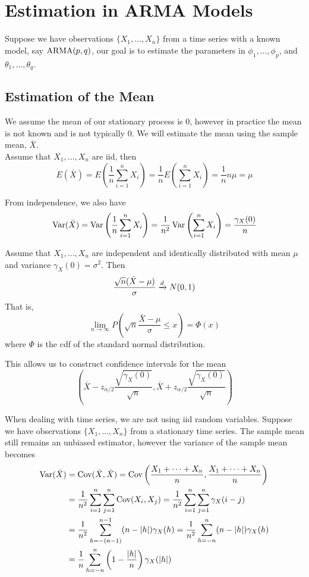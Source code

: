 

\chapter{Estimation in ARMA Models}

Suppose we have observations $\{X_1, \ldots, X_n\}$ from a time series with a known model, say $\operatorname{ARMA}(p,q)$, our goal is to estimate the parameters in $\phi_1,\ldots,\phi_p$, and $\theta_1,\ldots,\theta_q$. 


\section{Estimation of the Mean}

We assume the mean of our stationary process is 0, however in practice the mean is not known and is not typically 0. We will estimate the mean using the sample mean, $\bar{X}$.\\

Assume that $X_1,\ldots,X_n$ are iid, then 
\[E(\bar{X}) = E\left(\frac{1}{n}\sum_{i=1}^n X_i\right) = \frac{1}{n}E\left(\sum_{i=1}^n X_i\right) = \frac{1}{n}n\mu = \mu\]

From independence, we also have
\[\operatorname{Var}(\bar{X}) = \operatorname{Var}\left(\frac{1}{n}\sum_{i=1}^n X_i\right) = \frac{1}{n^2} \operatorname{Var}\left(\sum_{i=1}^n X_i\right) = \frac{\gamma_X(0)}{n}\]

\begin{lemma}
    Assume that $X_1,\ldots, X_n$ are independent and identically distributed with mean $\mu$ and variance $\gamma_X(0) = \sigma^2$. Then 
    \[\frac{\sqrt{n}(\bar{X}-\mu)}{\sigma} \xrightarrow{d} N(0,1)\]
    That is, 
    \[\lim_{n\rightarrow \infty} P\left(\sqrt{n} \frac{\bar{X}-\mu}{\sigma}\leq x\right) = \Phi(x)\]
    where $\Phi$ is the cdf of the standard normal distribution.
\end{lemma}

This allows us to construct confidence intervals for the mean 
\[\left(\bar{X} - z_{\alpha/2} \frac{\sqrt{\gamma_X(0)}}{\sqrt{n}}, \bar{X} + z_{\alpha/2} \frac{\sqrt{\gamma_X(0)}}{\sqrt{n}}\right)\]

When dealing with time series, we are not using iid random variables. Suppose we have observations $\{X_1,\ldots, X_n\}$ from a stationary time series. The sample mean still remains an unbiased estimator, however the variance of the sample mean becomes 
\begin{align*}
    \operatorname{Var}(\bar{X}) &= \operatorname{Cov}(\bar{X}, \bar{X}) = \operatorname{Cov}\left(\frac{X_1 + \cdots + X_n}{n}, \frac{X_1 + \cdots + X_n}{n}\right)\\
    &= \frac{1}{n^2}\sum_{i=1}^n \sum_{j=1}^n \operatorname{Cov}(X_i,X_j) = \frac{1}{n^2}\sum_{i=1}^n \sum_{j=1}^n \gamma_X(i-j)\\
    &= \frac{1}{n^2}\sum_{h=-(n-1)}^{n-1} (n-|h|)\gamma_X(h) = \frac{1}{n^2}\sum_{h=-n}^n (n-|h|)\gamma_X(h)\\
    &= \frac{1}{n}\sum_{h=-n}^n \left(1-\frac{|h|}{n}\right)\gamma_X(|h|)
\end{align*}

